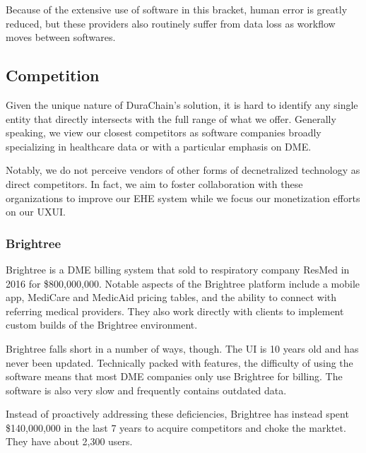 \documentclass[letterpaper]{article}
\begin{document}
  Because of the extensive use of software in this bracket, human error is greatly reduced, but these providers also routinely suffer from data loss as workflow moves between softwares.%

\subsection{Competition}
Given the unique nature of DuraChain's solution, it is hard to identify any single entity that directly intersects with the full range of what we offer. Generally speaking, we view our closest competitors as software companies broadly specializing in healthcare data or with a particular emphasis on DME.%

Notably, we do not perceive vendors of other forms of decnetralized technology as direct competitors. In fact, we aim to foster collaboration with these organizations to improve our EHE system while we focus our monetization efforts on our UXUI.%

  \subsubsection{Brightree}
  Brightree is a DME billing system that sold to respiratory company ResMed in 2016 for \$800,000,000. Notable aspects of the Brightree platform include a mobile app, MediCare and MedicAid pricing tables, and the ability to connect with referring medical providers. They also work directly with clients to implement custom builds of the Brightree environment.%

  Brightree falls short in a number of ways, though. The UI is 10 years old and has never been updated. Technically packed with features, the difficulty of using the software means that most DME companies only use Brightree for billing. The software is also very slow and frequently contains outdated data.%

  Instead of proactively addressing these deficiencies, Brightree has instead spent \$140,000,000 in the last 7 years to acquire competitors and choke the marktet. They have about 2,300 users.%
\end{document}
